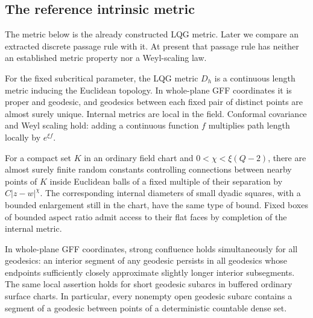 \subsection{The reference intrinsic metric}

The metric below is the already constructed LQG metric. Later we compare
an extracted discrete passage rule with it. At present that passage rule
has neither an established metric property nor a Weyl-scaling law.

\begin{theorem}\label{bg:metric-inputs}
For the fixed subcritical parameter, the LQG metric \(D_h\) is a continuous length metric inducing the Euclidean topology. In whole-plane GFF coordinates it is proper and geodesic, and geodesics between each fixed pair of distinct points are almost surely unique. Internal metrics are local in the field. Conformal covariance and Weyl scaling hold: adding a continuous function \(f\) multiplies path length locally by \(e^{\xi f}\).

For a compact set \(K\) in an ordinary field chart and
\(0<\chi<\xi(Q-2)\), there are almost surely finite random constants controlling connections between nearby points of \(K\) inside Euclidean balls of a fixed multiple of their separation by \(C|z-w|^\chi\). The corresponding internal diameters of small dyadic squares, with a bounded enlargement still in the chart, have the same type of bound. Fixed boxes of bounded aspect ratio admit access to their flat faces by completion of the internal metric.

In whole-plane GFF coordinates, strong confluence holds simultaneously for all geodesics: an interior segment of any geodesic persists in all geodesics whose endpoints sufficiently closely approximate slightly longer interior subsegments. The same local assertion holds for short geodesic subarcs in buffered ordinary surface charts. In particular, every nonempty open geodesic subarc contains a segment of a geodesic between points of a deterministic countable dense set.
\end{theorem}
